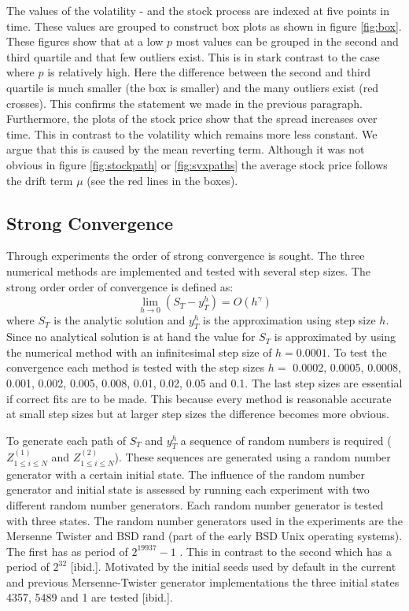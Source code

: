 \documentclass[a4paper,onecolumn]{IEEEtran}
\begin{document}
The values of the volatility - and the stock process are indexed at five
points in time. These values are grouped to construct box plots as shown in
figure \ref{fig:box}. These figures show that at a low $p$ most values can be
grouped in the second and third quartile and that few outliers exist. This is
in stark contrast to the case where $p$ is relatively high. Here the
difference between the second and third quartile is much smaller (the box is
smaller) and the many outliers exist (red crosses). This confirms the
statement we made in the previous paragraph. Furthermore, the plots of the
stock price show that the spread increases over time. This in contrast to the
volatility which remains more less constant. We argue that this is caused by
the mean reverting term. Although it was not obvious in figure
\ref{fig:stockpath} or \ref{fig:svxpaths} the average stock price follows the
drift term $\mu$ (see the red lines in the boxes).


\subsection{Strong Convergence}
Through experiments the order of strong convergence is sought. The three
numerical methods are implemented and tested with several step sizes. The
strong order order of convergence is defined as:
\begin{equation}\label{eq:strng}
\lim_{h\rightarrow 0}(S_T - y_T^h) = O(h^\gamma)
\end{equation}
where $S_T$ is the analytic solution and $y_T^h$ is the approximation using
step size $h$. Since no analytical solution is at hand the value for $S_T$ is
approximated by using the numerical method with an infinitesimal step size of
$h = 0.0001$. To test the convergence each method is tested with the step
sizes  $h =$ 0.0002, 0.0005, 0.0008, 0.001, 0.002, 0.005, 0.008, 0.01, 0.02,
0.05 and 0.1. The last step sizes are essential if correct fits are to be
made. This because every method is reasonable accurate at small step sizes but
at larger step sizes the difference becomes more obvious.

To generate each path of $S_T$ and $y_T^h$ a sequence of random numbers is
required ($Z^{(1)}_{1\leq i \leq N}$ and $Z^{(2)}_{1\leq i \leq N}$). These
sequences are generated using a random number generator with a certain initial
state.  The influence of the random number generator and initial state is
assessed by running each experiment with two different random number
generators. Each random number generator is tested with three states. The
random number generators used in the experiments are the Mersenne Twister
\cite{matsumoto1998mtd} and BSD rand (part of the early BSD Unix operating
systems). The first has as period of $2^{19937} - 1$ \cite{Galassi:2006:GSL}.
This in contrast to the second which has a period of $2^{32}$ [ibid.].
Motivated by the initial seeds used by default in the current and previous
Mersenne-Twister generator implementations the three initial states 4357, 5489
and 1 are tested [ibid.].
\end{document}
